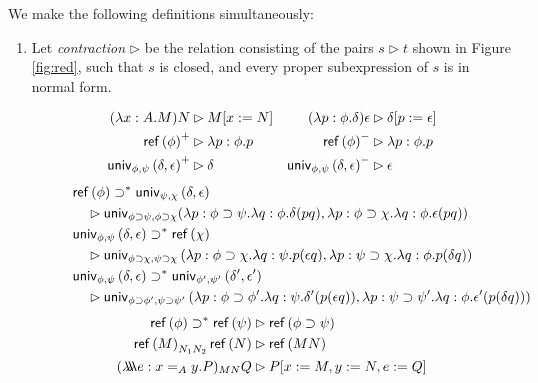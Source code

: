 \begin{definition}
We make the following definitions simultaneously:
\begin{enumerate}
\item
Let \emph{contraction} $\rhd$ be the relation consisting of the pairs $s \rhd t$ shown in Figure \ref{fig:red}, 
such that $s$ is closed, and every proper subexpression of $s$ is in normal form.

\begin{figure}
\begin{framed}
\begin{align*}
(\lambda x:A.M)N & \rhd M[x:=N] & (\lambda p:\phi.\delta)\epsilon & \rhd \delta[p:=\epsilon] \\
 \mathsf{ref} \left( {\phi} \right)^+ & \rhd \lambda p:\phi.p & \mathsf{ref} \left( {\phi} \right)^- & \rhd \lambda p:\phi.p \\
\mathsf{univ}_{{\phi} , {\psi}} \left( {\delta} , {\epsilon} \right)^+ & \rhd \delta & \mathsf{univ}_{{\phi} , {\psi}} \left( {\delta} , {\epsilon} \right)^- & \rhd \epsilon
\end{align*}
\begin{align*}
& \mathsf{ref} \left( {\phi} \right) \supset^* \mathsf{univ}_{{\psi} , {\chi}} \left( {\delta} , {\epsilon} \right) \\
& \quad \rhd \mathsf{univ}_{\phi \supset \psi,\phi \supset \chi}(\lambda p : \phi \supset \psi. \lambda q : \phi . \delta (p q), 
\lambda p : \phi \supset \chi. \lambda q : \phi . \epsilon (p q)) \\
& \mathsf{univ}_{{\phi} , {\psi}} \left( {\delta} , {\epsilon} \right) \supset^* \mathsf{ref} \left( {\chi} \right) \\
& \quad \rhd \mathsf{univ}_{{\phi \supset \chi} , {\psi \supset \chi}} \left( {\lambda p : \phi \supset \chi . \lambda q : \psi .p (\epsilon q)} , {\lambda p : \psi \supset \chi . \lambda q : \phi .p (\delta q)} \right) \\
& \mathsf{univ}_{{\phi} , {\psi}} \left( {\delta} , {\epsilon} \right) \supset^* \mathsf{univ}_{{\phi'} , {\psi'}} \left( {\delta'} , {\epsilon'} \right) \\
& \quad \rhd \mathsf{univ}_{{\phi \supset \phi'} , {\psi \supset \psi'}} \left( {\lambda p : \phi \supset \phi' . \lambda q : \psi . \delta' (p (\epsilon q))} , {\lambda p : \psi \supset \psi'. \lambda q : \phi . \epsilon' (p (\delta q))} \right)
\end{align*}
\begin{align*}
\reff{\phi} \supset^* \reff{\psi} & \rhd \reff{\phi \supset \psi} \\
\reff{M}_{N_1N_2} \reff{N} & \rhd \reff{MN} \\
(\triplelambda e:x =_A y. P)_{MN}Q & \rhd P[x:=M, y:=N, e:=Q] \\

\end{align*}
\end{framed}
\end{figure}
\end{enumerate}
\end{definition}
